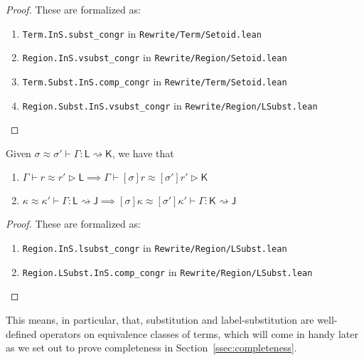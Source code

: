 \documentclass[acmsmall,screen,review]{acmart}
\newcommand{\ms}[1]{\ensuremath{\mathsf{#1}}}
\newcommand{\lbsubst}[4]{#1 \vdash #2: #3 \rightsquigarrow #4}
\newcommand{\teqv}{\approx}
\newcommand{\lbeq}[4]{#1 \vdash #2 \teqv #3 \rhd {#4}}
\newcommand{\lbseq}[5]{\lbsubst{#1 \teqv #2}{#3}{#4}{#5}}
\begin{document}
\begin{proof}
  These are formalized as:
  \begin{enumerate}[label=(\alph*)]
    \item \texttt{Term.InS.subst_congr} in \texttt{Rewrite/Term/Setoid.lean}
    \item \texttt{Region.InS.vsubst_congr} in \texttt{Rewrite/Region/Setoid.lean}
    \item \texttt{Term.Subst.InS.comp_congr} in \texttt{Rewrite/Term/Setoid.lean}
    \item \texttt{Region.Subst.InS.vsubst_congr} in \texttt{Rewrite/Region/LSubst.lean}
  \end{enumerate}
\end{proof}
\begin{lemma}
  Given $\lbseq{\sigma}{\sigma'}{\Gamma}{\ms{L}}{\ms{K}}$, we have that
  \begin{enumerate}[label=(\alph*)]
    \item $\lbeq{\Gamma}{r}{r'}{\ms{L}} \implies \lbeq{\Gamma}{[\sigma]r}{[\sigma']r'}{\ms{K}}$
    \item $\lbseq{\kappa}{\kappa'}{\Gamma}{\ms{L}}{\ms{J}}
      \implies \lbseq{[\sigma]\kappa}{[\sigma']\kappa'}{\Gamma}{\ms{K}}{\ms{J}}$
  \end{enumerate}
\end{lemma}
\begin{proof}
  These are formalized as:
  \begin{enumerate}[label=(\alph*)]
    \item \texttt{Region.InS.lsubst_congr} in \texttt{Rewrite/Region/LSubst.lean}
    \item \texttt{Region.LSubst.InS.comp_congr} in \texttt{Rewrite/Region/LSubst.lean}
  \end{enumerate}
\end{proof}
This means, in particular, that, substitution and label-substitution are well-defined operators on
equivalence classes of terms, which will come in handy later as we set out to prove completeness
in Section~\ref{ssec:completeness}.
\end{document}
